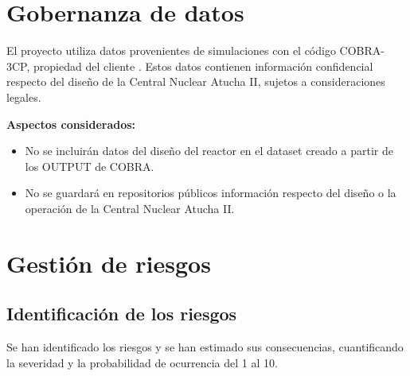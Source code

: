\documentclass[
11pt, %
]{charter}
\newcommand{\CNA}{Central Nuclear Atucha II}
\begin{document}
\section{Gobernanza de datos}
\label{sec:gobernanza}

El proyecto utiliza datos provenientes de simulaciones con el código COBRA-3CP, propiedad del cliente \empclientename{}. Estos datos contienen información confidencial respecto del diseño de la \CNA{}, sujetos a consideraciones legales.

\textbf{Aspectos considerados:}
\begin{itemize}
  \item No se incluirán datos del diseño del reactor en el dataset creado a partir de los OUTPUT de COBRA.
  \item No se guardará en repositorios públicos información respecto del diseño o la operación de la \CNA{}.
\end{itemize}

\section{Gestión de riesgos}
\label{sec:riesgos}

\subsection{Identificación de los riesgos}
Se han identificado los riesgos y se han estimado sus consecuencias, cuantificando la severidad y la probabilidad de ocurrencia del 1 al 10.
\end{document}
